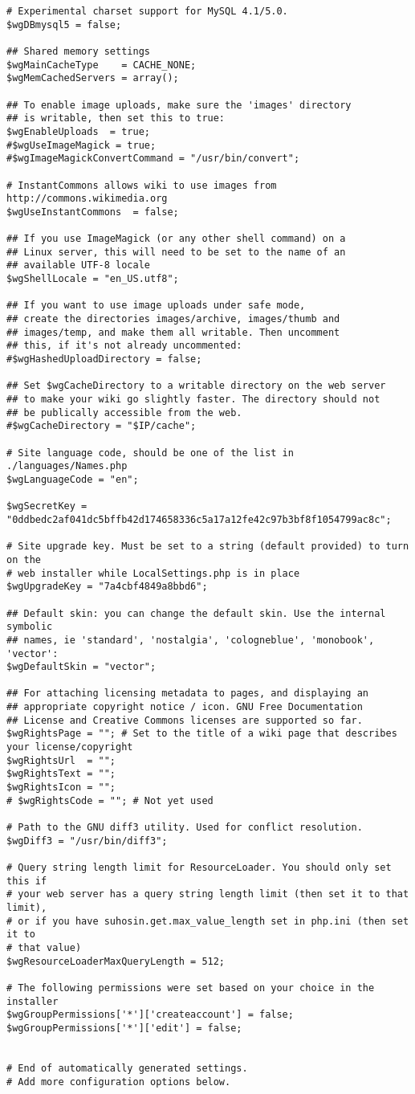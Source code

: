 \begin{lstlisting}
# Experimental charset support for MySQL 4.1/5.0.
$wgDBmysql5 = false;

## Shared memory settings
$wgMainCacheType    = CACHE_NONE;
$wgMemCachedServers = array();

## To enable image uploads, make sure the 'images' directory
## is writable, then set this to true:
$wgEnableUploads  = true;
#$wgUseImageMagick = true;
#$wgImageMagickConvertCommand = "/usr/bin/convert";

# InstantCommons allows wiki to use images from http://commons.wikimedia.org
$wgUseInstantCommons  = false;

## If you use ImageMagick (or any other shell command) on a
## Linux server, this will need to be set to the name of an
## available UTF-8 locale
$wgShellLocale = "en_US.utf8";

## If you want to use image uploads under safe mode,
## create the directories images/archive, images/thumb and
## images/temp, and make them all writable. Then uncomment
## this, if it's not already uncommented:
#$wgHashedUploadDirectory = false;

## Set $wgCacheDirectory to a writable directory on the web server
## to make your wiki go slightly faster. The directory should not
## be publically accessible from the web.
#$wgCacheDirectory = "$IP/cache";

# Site language code, should be one of the list in ./languages/Names.php
$wgLanguageCode = "en";

$wgSecretKey = "0ddbedc2af041dc5bffb42d174658336c5a17a12fe42c97b3bf8f1054799ac8c";

# Site upgrade key. Must be set to a string (default provided) to turn on the
# web installer while LocalSettings.php is in place
$wgUpgradeKey = "7a4cbf4849a8bbd6";

## Default skin: you can change the default skin. Use the internal symbolic
## names, ie 'standard', 'nostalgia', 'cologneblue', 'monobook', 'vector':
$wgDefaultSkin = "vector";

## For attaching licensing metadata to pages, and displaying an
## appropriate copyright notice / icon. GNU Free Documentation
## License and Creative Commons licenses are supported so far.
$wgRightsPage = ""; # Set to the title of a wiki page that describes your license/copyright
$wgRightsUrl  = "";
$wgRightsText = "";
$wgRightsIcon = "";
# $wgRightsCode = ""; # Not yet used

# Path to the GNU diff3 utility. Used for conflict resolution.
$wgDiff3 = "/usr/bin/diff3";

# Query string length limit for ResourceLoader. You should only set this if
# your web server has a query string length limit (then set it to that limit),
# or if you have suhosin.get.max_value_length set in php.ini (then set it to
# that value)
$wgResourceLoaderMaxQueryLength = 512;

# The following permissions were set based on your choice in the installer
$wgGroupPermissions['*']['createaccount'] = false;
$wgGroupPermissions['*']['edit'] = false;


# End of automatically generated settings.
# Add more configuration options below.
\end{lstlisting}

